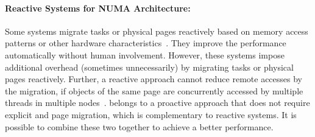 \paragraph{Reactive Systems for NUMA Architecture:} Some systems migrate tasks or physical pages reactively based on memory access patterns or other hardware characteristics~\cite{Blagodurov:2011:CNC:2002181.2002182, AutoNUMA, Dashti:2013:TMH:2451116.2451157, Lepers:2015:TMP:2813767.2813788}. They improve the performance automatically without human involvement. However, these systems impose additional overhead (sometimes unnecessarily)  by migrating tasks or physical pages reactively. Further, a reactive approach cannot reduce remote accesses by the migration, if objects of the same page are concurrently accessed by multiple threads in multiple nodes~\cite{Gaud:2014:LPM:2643634.2643659}. \NM{} belongs to a proactive approach that does not require explicit and page migration, which is complementary to reactive systems. It is possible to combine these two together to achieve a better performance. 

